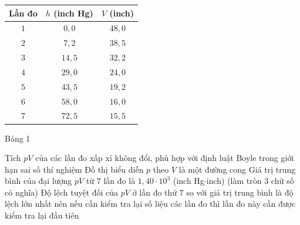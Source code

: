 \begin{ex}
\begin{center}
\begin{minipage}[b]{0.4\linewidth}
{\begin{tabular}{|c|c|c|}
					\hline
					\textbf{Lần đo} & \textbf{$h$ (inch Hg)} & \textbf{$V$ (inch)}\\
					\hline
					$1$ & $0{,}0$ & $48{,}0$\\
					\hline
					$2$ & $7{,}2$ & $38{,}5$\\
					\hline
					$3$ & $14{,}5$ & $32{,}2$\\
					\hline
					$4$ & $29{,}0$ & $24{,}0$\\
					\hline
					$5$ & $43{,}5$ & $19{,}2$\\
					\hline
					$6$ & $58{,}0$ & $16{,}0$\\
					\hline
					$7$ & $72{,}5$ & $15{,}5$\\
					\hline
				\end{tabular}\par\smallskip
				Bảng 1}
			\end{minipage}
		\end{center}
		\choiceTFt
		{\True Tích $pV$ của các lần đo xấp xỉ không đổi, phù hợp với định luật Boyle trong giới hạn sai số thí nghiệm}
		{\True Đồ thị biểu diễn $p$ theo $V$ là một đường cong}
		{Giá trị trung bình của đại lượng $pV$ từ $7$ lần đo là $1{,}40\cdot 10^3$ (inch Hg$\cdot$inch) (làm tròn $3$ chữ số có nghĩa)}
		{\True Độ lệch tuyệt đối của $pV$ ở lần đo thứ $7$ so với giá trị trung bình là độ lệch lớn nhất nên nếu cần kiểm tra lại số liệu các lần đo thì lần đo này cần được kiểm tra lại đầu tiên}
	\end{ex}


